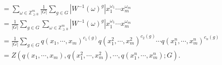 \begin{prf}
\begin{align*}
                                                 & =\sum_{\omega \in \mathbb{Z}_{\ge 0}^m}\frac{1}{|G|}\sum_{g \in G}\left|W^{-1}(\omega)^g\right| x_1^{\omega_1} \cdots x_m^{\omega_m}                         \\
                                                 & =\frac{1}{|G|}\sum_{g \in G}\sum_{\omega \in \mathbb{Z}_{\ge 0}^m}\left|W^{-1}(\omega)^g\right| x_1^{\omega_1} \cdots x_m^{\omega_m}                         \\
                                                 & =\frac{1}{|G|}\sum_{g \in G}q(x_1,  \cdots,x_m)^{c_1(g)} q \left (x_1^2, \cdots,x_m^2 \right )^{c_2(g)} \cdots q \left (x_1^n, \cdots,x_m^n\right )^{c_n(g)} \\
                                                 & = Z\left(q\left(x_1, \cdots,x_m\right), q\left(x_1^2, \cdots,x_m^2\right), \cdots, q\left(x_1^n, \cdots,x_m^n\right);G\right).
    \end{align*}
\end{prf}

